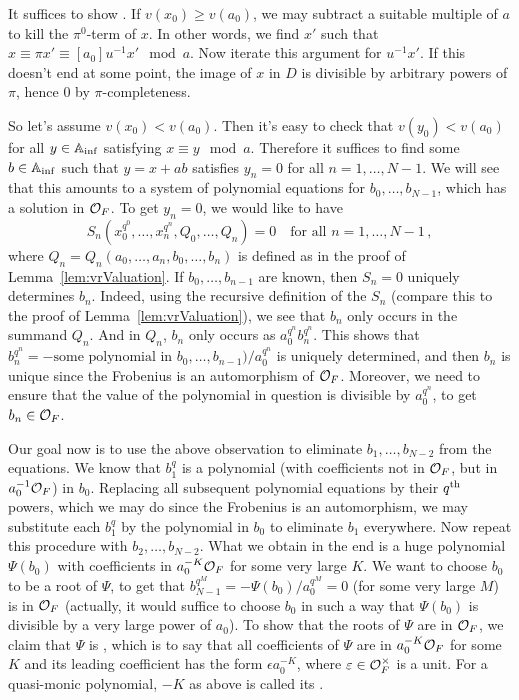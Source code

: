 \begin{proof*}
	It suffices to show \itememph{*}. If $v(x_0)\geq v(a_0)$, we may subtract a suitable multiple of $a$ to kill the $\pi^0$-term of $x$. In other words, we find $x'$ such that $x\equiv \pi x'\equiv [a_0]u^{-1}x'\mod a$. Now iterate this argument for $u^{-1}x'$. If this doesn't end at some point, the image of $x$ in $D$ is divisible by arbitrary powers of $\pi$, hence $0$ by $\pi$-completeness.
	
	So let's assume $v(x_0)<v(a_0)$. Then it's easy to check that $v(y_0)<v(a_0)$ for all $y\in\mathbb{A}_{\mathrm{inf}}$ satisfying $x\equiv y\mod a$. Therefore it suffices to find some $b\in \mathbb{A}_{\mathrm{inf}}$ such that $y=x+ab$ satisfies $y_n=0$ for all $n=1,\dotsc,N-1$. We will see that this amounts to a system of polynomial equations for $b_0,\dotsc,b_{N-1}$, which has a solution in $\mathcal{O}_F$. To get $y_n=0$, we would like to have
	\begin{equation*}
		S_n\left(x_0^{q^0},\dotsc,x_n^{q^n},Q_0,\dotsc,Q_n\right)=0\quad\text{for all }n=1,\dotsc,N-1\,,
	\end{equation*}
	where $Q_n=Q_n(a_0,\dotsc,a_n,b_0,\dotsc,b_n)$ is defined as in the proof of Lemma~\cref{lem:vrValuation}. If $b_0,\dotsc,b_{n-1}$ are known, then $S_n=0$ uniquely determines $b_n$. Indeed, using the recursive definition of the $S_n$ (compare this to the proof of Lemma~\cref{lem:vrValuation}), we see that $b_n$ only occurs in the summand $Q_n$. And in $Q_n$, $b_n$ only occurs as $a_0^{q^n}b_n^{q^n}$. This shows that $b_n^{q^n}=-\text{some polynomial in $b_0,\dotsc,b_{n-1}$})/a_0^{q^n}$ is uniquely determined, and then $b_n$ is unique since the Frobenius is an automorphism of $\mathcal{O}_F$. Moreover, we need to ensure that the value of the polynomial in question is divisible by $a_0^{q^n}$, to get $b_n\in\mathcal{O}_F$.
	
	Our goal now is to use the above observation to eliminate $b_1,\dotsc,b_{N-2}$ from the equations. We know that $b_1^q$ is a polynomial (with coefficients not in $\mathcal{O}_F$, but in $a_0^{-1}\mathcal{O}_F$) in $b_0$. Replacing all subsequent polynomial equations by their $q^{\text{th}}$ powers, which we may do since the Frobenius is an automorphism, we may substitute each $b_1^q$ by the polynomial in $b_0$ to eliminate $b_1$ everywhere. Now repeat this procedure with $b_2,\dotsc,b_{N-2}$. What we obtain in the end is a huge polynomial $\Psi(b_0)$ with coefficients in $a_0^{-K}\mathcal{O}_F$ for some very large $K$. We want to choose $b_0$ to be a root of $\Psi$, to get that $b_{N-1}^{q^M}=-\Psi(b_0)/a_0^{q^M}=0$ (for some very large $M$) is in $\mathcal{O}_F$ (actually, it would suffice to choose $b_0$ in such a way that $\Psi(b_0)$ is divisible by a very large power of $a_0$). To show that the roots of $\Psi$ are in $\mathcal{O}_F$, we claim that $\Psi$ is , which is to say that all coefficients of $\Psi$ are in $a_0^{-K}\mathcal{O}_F$ for some $K$ and its leading coefficient has the form $\epsilon a_0^{-K}$, where $\varepsilon\in\mathcal{O}_F^\times$ is a unit. For a quasi-monic polynomial, $-K$ as above is called its .
	

\end{proof*}
